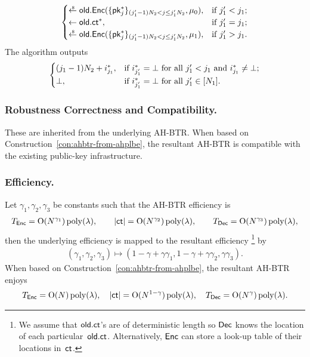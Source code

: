 \begin{construction}
\begin{itemize}
\begin{align*}
\begin{cases}
\draws\OLD.\Enc(\{\pk^\ast_j\}_{(j_1'-1)N_2<j\leq j_1'N_2},\mu_0),&
\textup{if }j_1'<j_1;\\
\gets\OLD.\ct^\ast,&\textup{if }j_1'=j_1;\\
\draws\OLD.\Enc(\{\pk^\ast_j\}_{(j_1'-1)N_2<j\leq j_1'N_2},\mu_1),&
\textup{if }j_1'>j_1.
\end{cases}
\end{align*}
The algorithm outputs
\begin{align*}
\begin{cases}
(j_1-1)N_2+i^\ast_{j_1},&\textup{if }
i^\ast_{j_1'}=\bot\textup{ for all }j_1'<j_1
\textup{ and }
i^\ast_{j_1}\neq\bot;\\
\bot,&\textup{if }i^\ast_{j_1'}=\bot\textup{ for all }j_1'\in[N_1].
\end{cases}
\end{align*}
\end{itemize}
\end{construction}

\subsubsection{Robustness Correctness and Compatibility.}
These are inherited from the underlying AH-BTR.
When based on Construction~\ref{con:ahbtr-from-ahplbe},
the resultant AH-BTR is compatible with the existing public-key infrastructure.

\subsubsection{Efficiency.}
Let $\gamma_1,\gamma_2,\gamma_3$ be constants such that the AH-BTR efficiency is
\begin{align*}
T_\Enc=\bigO(N^{\gamma_1})\poly(\lambda),\qquad
|\ct|=\bigO(N^{\gamma_2})\poly(\lambda),\qquad
T_\Dec=\bigO(N^{\gamma_3})\poly(\lambda),
\end{align*}
then the underlying efficiency is mapped to the resultant efficiency%
\footnote{We assume that $\OLD.\ct$'s are of deterministic length
so $\Dec$ knows the location of each particular~$\OLD.\ct$.
Alternatively, $\Enc$ can store a look-up table of their locations in~$\ct$.}
by
\begin{align*}
(\gamma_1,\gamma_2,\gamma_3)\mapsto
(1-\gamma+\gamma\gamma_1,1-\gamma+\gamma\gamma_2,\gamma\gamma_3).
\end{align*}
When based on Construction~\ref{con:ahbtr-from-ahplbe},
the resultant AH-BTR enjoys
\begin{align*}
T_\Enc=\bigO(N)\poly(\lambda),\quad
|\ct|=\bigO(N^{1-\gamma})\poly(\lambda),\quad
T_\Dec=\bigO(N^\gamma)\poly(\lambda).
\end{align*}
